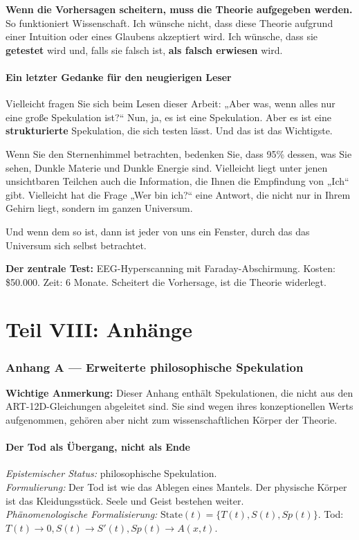 \textbf{Wenn die Vorhersagen scheitern, muss die Theorie aufgegeben werden.} So funktioniert Wissenschaft. Ich wünsche nicht, dass diese Theorie aufgrund einer Intuition oder eines Glaubens akzeptiert wird. Ich wünsche, dass sie \textbf{getestet} wird und, falls sie falsch ist, \textbf{als falsch erwiesen} wird.

\subsection{Ein letzter Gedanke für den neugierigen Leser}
Vielleicht fragen Sie sich beim Lesen dieser Arbeit: „Aber was, wenn alles nur eine große Spekulation ist?`` Nun, ja, es ist eine Spekulation. Aber es ist eine \textbf{strukturierte} Spekulation, die sich testen lässt. Und das ist das Wichtigste.

Wenn Sie den Sternenhimmel betrachten, bedenken Sie, dass 95\% dessen, was Sie sehen, Dunkle Materie und Dunkle Energie sind. Vielleicht liegt unter jenen unsichtbaren Teilchen auch die Information, die Ihnen die Empfindung von „Ich`` gibt. Vielleicht hat die Frage „Wer bin ich?`` eine Antwort, die nicht nur in Ihrem Gehirn liegt, sondern im ganzen Universum.

Und wenn dem so ist, dann ist jeder von uns ein Fenster, durch das das Universum sich selbst betrachtet.

\textbf{Der zentrale Test:} EEG-Hyperscanning mit Faraday-Abschirmung. Kosten: \$50.000. Zeit: 6 Monate. Scheitert die Vorhersage, ist die Theorie widerlegt.

\newpage
\part*{Teil VIII: Anhänge}

\section{Anhang A --- Erweiterte philosophische Spekulation}
\textbf{Wichtige Anmerkung:} Dieser Anhang enthält Spekulationen, die nicht aus den ART-12D-Gleichungen abgeleitet sind. Sie sind wegen ihres konzeptionellen Werts aufgenommen, gehören aber nicht zum wissenschaftlichen Körper der Theorie.

\subsection{Der Tod als Übergang, nicht als Ende}
\textit{Epistemischer Status:} philosophische Spekulation. \\
\textit{Formulierung:} Der Tod ist wie das Ablegen eines Mantels. Der physische Körper ist das Kleidungsstück. Seele und Geist bestehen weiter. \\
\textit{Phänomenologische Formalisierung:} $\text{State}(t) = \{ T(t), S(t), Sp(t) \}$. Tod: $T(t) \to 0, S(t) \to S'(t), Sp(t) \to A(x,t)$.


